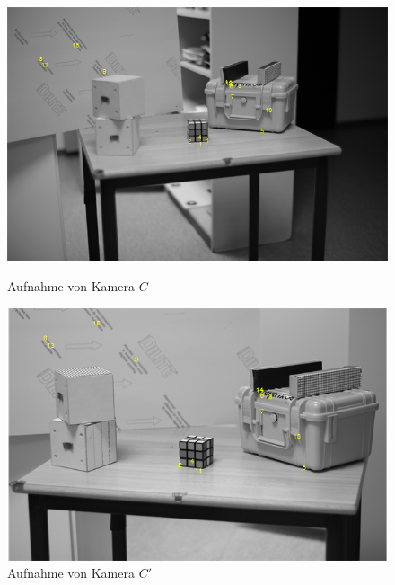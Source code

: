 \begin{figure}[!htb]
	\includegraphics[width=\linewidth]{images/PointsDetectedLeft.png}
	\caption[Aufnahme von Kamera $C$]{Aufnahme von Kamera $C$}
	\label{fig:SurfRechts}
	\endminipage\hfill
	\includegraphics[width=\linewidth]{images/PointsDetectedRight.png}
	\caption[Aufnahme von Kamera $C'$]{Aufnahme von Kamera $C'$}
	\label{fig:SurfLinks}
	\endminipage\hfill
\end{figure}
\pagebreak

